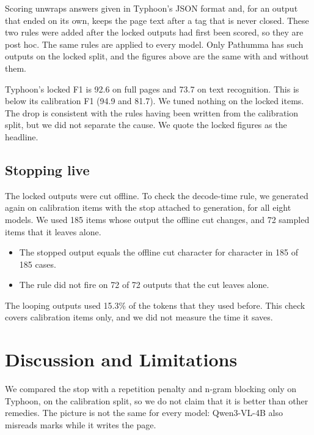 Scoring unwraps answers given in Typhoon's JSON format and, for an output that ended on its own, keeps the page text after a  tag that is never closed. These two rules were added after the locked outputs had first been scored, so they are post hoc. The same rules are applied to every model. Only Pathumma has such outputs on the locked split, and the figures above are the same with and without them.

Typhoon's locked F1 is 92.6 on full pages and 73.7 on text recognition. This is below its calibration F1 (94.9 and 81.7). We tuned nothing on the locked items. The drop is consistent with the rules having been written from the calibration split, but we did not separate the cause. We quote the locked figures as the headline.

\subsection{Stopping live}
The locked outputs were cut offline. To check the decode-time rule, we generated again on calibration items with the stop attached to generation, for all eight models. We used 185 items whose output the offline cut changes, and 72 sampled items that it leaves alone.
\begin{itemize}
\item The stopped output equals the offline cut character for character in 185 of 185 cases.
\item The rule did not fire on 72 of 72 outputs that the cut leaves alone.
\end{itemize}
The looping outputs used 15.3\% of the tokens that they used before. This check covers calibration items only, and we did not measure the time it saves.

\section{Discussion and Limitations}
We compared the stop with a repetition penalty and n-gram blocking only on Typhoon, on the calibration split, so we do not claim that it is better than other remedies. The picture is not the same for every model: Qwen3-VL-4B also misreads marks while it writes the page.

